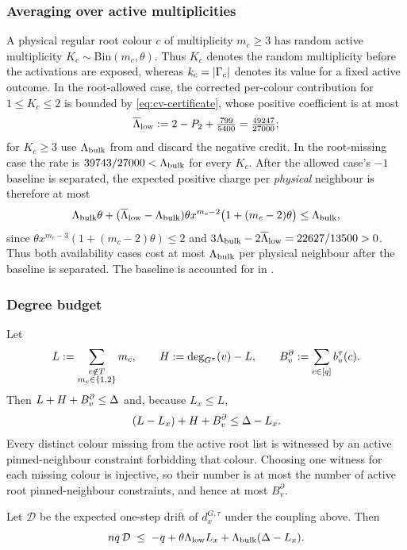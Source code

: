 \subsubsection{Averaging over active multiplicities}
A physical regular root colour \(c\) of multiplicity \(m_c\ge3\) has random
active multiplicity \(K_c\sim\mathrm{Bin}(m_c,\theta)\).  Thus \(K_c\)
denotes the random multiplicity before the activations are exposed, whereas
\(k_c=\left|\Gamma_c\right|\) denotes its value for a fixed active outcome.  In the
root-allowed case, the corrected per-colour contribution for
\(1\le K_c\le2\) is
bounded by \eqref{eq:cv-certificate}, whose positive coefficient is at most
\[
 \overline\Lambda_{\rm low}:=
 2-P_2+\tfrac{799}{5400}=\tfrac{49247}{27000};
\]
for \(K_c\ge3\) use $\Lambda_{\rm bulk}$ from  and discard
the negative credit. In the root-missing case the rate is
\(39743/27000<\Lambda_{\rm bulk}\) for every \(K_c\). After the allowed case's
$-1$ baseline is separated,
the expected positive charge per
\emph{physical} neighbour is therefore at most
\[
 \Lambda_{\rm bulk}\theta+
 (\overline\Lambda_{\rm low}-\Lambda_{\rm bulk})
 \theta x^{m_c-2}\bigl(1+(m_c-2)\theta\bigr)
 \le\Lambda_{\rm bulk},
\]
since \(\theta x^{m_c-3}(1+(m_c-2)\theta)\le2\) and
$3\Lambda_{\rm bulk}-2\overline\Lambda_{\rm low}
=22627/13500>0$.  Thus both availability cases cost at most
$\Lambda_{\rm bulk}$ per physical neighbour after the baseline is
separated. The baseline is accounted for in
.

\subsubsection{Degree budget}
Let
\[
 L:=\sum_{\substack{c\notin T\\m_c\in\left\{1,2\right\}}}m_c,\qquad
 H:=\deg_{G^\tau}(v)-L,\qquad
 B_v^{\partial}:=\sum_{c\in[q]}b_v^\tau(c).
\]
Then $L+H+B_v^{\partial}\le\Delta$ and, because $L_x\le L$,
\begin{equation}\label{eq:cv-resource}
 (L-L_x)+H+B_v^{\partial}\le\Delta-L_x.
\end{equation}
Every distinct colour missing from the active root list is witnessed by an
active pinned-neighbour constraint forbidding that colour.  Choosing one witness
for each missing colour is injective, so their number is at most the number
of active root pinned-neighbour constraints, and hence at most \(B_v^{\partial}\).

\begin{lemma}\label{lem:cv-assembly}
Let $\mathcal D$ be the expected one-step drift of $d_x^{G,\tau}$ under the coupling
above. Then
\begin{equation}\label{eq:cv-envelope}
  nq\,\mathcal D\;\le\;-q
      +\theta\Lambda_{\rm low}L_x
      +\Lambda_{\rm bulk}(\Delta-L_x).
\end{equation}
\end{lemma}

